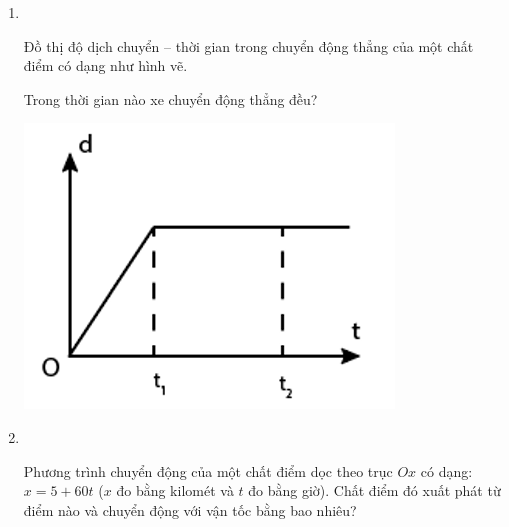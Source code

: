 \begin{enumerate}[label=\bfseries Câu \arabic*:,leftmargin=1.5cm]
\item {}\\
{Đồ thị độ dịch chuyển – thời gian trong chuyển động thẳng của một chất điểm có dạng như hình vẽ.\\
	\begin{minipage}[l]{0.5\textwidth}
		Trong thời gian nào xe chuyển động thẳng đều?
	\end{minipage}
\begin{minipage}{0.5\textwidth}
	\begin{center}
		\includegraphics[width=0.5\linewidth]{../figs/VN10-2023-PH-TP005-P-4}
	\end{center}
\end{minipage}
}

\item {}\\
{Phương trình chuyển động của một chất điểm dọc theo trục $Ox$ có dạng: $x = 5 + 60t$ ($x$ đo bằng kilomét và $t$ đo bằng giờ). Chất điểm đó xuất phát từ điểm nào và chuyển động với vận tốc bằng bao nhiêu?

}
\end{enumerate}
